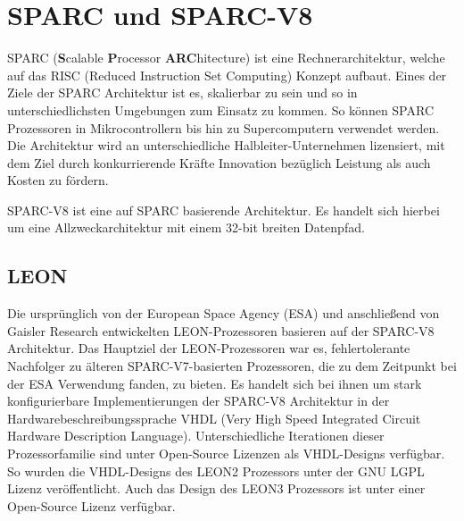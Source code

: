 



\section{SPARC und SPARC-V8}

SPARC (\textbf{S}calable \textbf{P}rocessor \textbf{ARC}hitecture) ist eine Rechnerarchitektur, welche auf das
RISC (Reduced Instruction Set Computing) Konzept aufbaut. Eines der Ziele der SPARC Architektur ist es, skalierbar
zu sein und so in unterschiedlichsten Umgebungen zum Einsatz zu kommen. So können SPARC Prozessoren in
Mikrocontrollern bis hin zu Supercomputern verwendet werden. Die Architektur wird an unterschiedliche
Halbleiter-Unternehmen lizensiert, mit dem Ziel durch konkurrierende Kräfte Innovation bezüglich Leistung als auch
Kosten zu fördern.\cite{sparc}

SPARC-V8 ist eine auf SPARC basierende Architektur. Es handelt sich hierbei um eine Allzweckarchitektur mit einem
32-bit breiten Datenpfad.\cite{sparcv8Eval}

\subsection{LEON}

Die ursprünglich von der European Space Agency (ESA) und anschließend von Gaisler Research entwickelten
LEON-Prozessoren basieren auf der SPARC-V8 Architektur.
Das Hauptziel der LEON-Prozessoren war es, fehlertolerante Nachfolger zu älteren SPARC-V7-basierten
Prozessoren, die zu dem Zeitpunkt bei der ESA Verwendung fanden, zu bieten.\cite{gaislerLeon}
Es handelt sich bei ihnen um stark konfigurierbare
Implementierungen der SPARC-V8 Architektur in der Hardwarebeschreibungssprache
VHDL (Very High Speed Integrated Circuit Hardware Description Language).
Unterschiedliche Iterationen dieser Prozessorfamilie sind unter Open-Source Lizenzen als VHDL-Designs verfügbar.
So wurden die VHDL-Designs des LEON2 Prozessors unter der GNU LGPL Lizenz veröffentlicht.\cite{sparcv8Eval}
Auch das Design des LEON3 Prozessors ist unter einer Open-Source Lizenz verfügbar\cite{invasiveArrays}.


